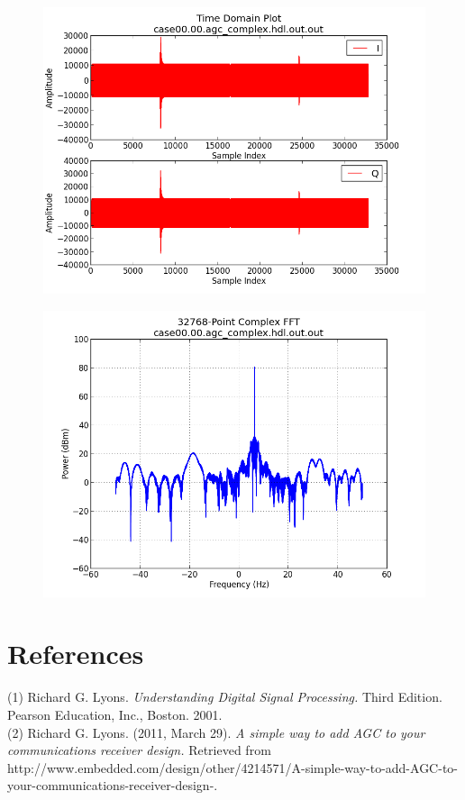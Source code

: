 \documentclass{article}
\begin{document}
	\begin{figure}[ht]
		\centering
		\begin{minipage}{.5\textwidth}
			\centering\includegraphics[width=1.0\linewidth]{output_time}
			\label{fig:out_time_tone}
		\end{minipage}%
		\begin{minipage}{.5\textwidth}
			\centering\includegraphics[width=1.0\linewidth]{output_freq}
			\label{fig:out_freq_tone}
		\end{minipage}
	\end{figure}

\section*{References}
(1) Richard G. Lyons. \textit{Understanding Digital Signal Processing.} Third Edition. Pearson Education, Inc., Boston. 2001. \\
(2) Richard G. Lyons. (2011, March 29). \textit{A simple way to add AGC to your communications receiver design.} Retrieved from http://www.embedded.com/design/other/4214571/A-simple-way-to-add-AGC-to-your-communications-receiver-design-.
\end{document}
